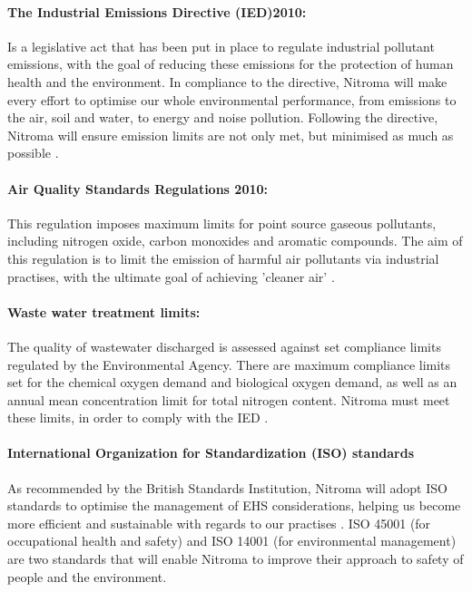 \paragraph{The Industrial Emissions Directive (IED)2010:}

Is a legislative act that has been put in place to regulate industrial pollutant emissions, with the goal of reducing these emissions for the protection of human health and the environment. In compliance to the directive, Nitroma will make every effort to optimise our whole environmental performance, from emissions to the air, soil and water, to energy and noise pollution. Following the directive, Nitroma will ensure emission limits are not only met, but minimised as much as possible \cite{european_commission_industrial_nodate}. 

\paragraph{Air Quality Standards Regulations 2010:}

This regulation imposes maximum limits for point source gaseous pollutants, including nitrogen oxide, carbon monoxides and aromatic compounds. The aim of this regulation is to limit the emission of harmful air pollutants via industrial practises, with the ultimate goal of achieving 'cleaner air' \cite{tilling_meeting_2017}.  

\paragraph{Waste water treatment limits:}

The quality of wastewater discharged is assessed against set compliance limits regulated by the Environmental Agency. There are maximum compliance limits set for the chemical oxygen demand and biological oxygen demand, as well as an annual mean concentration limit for total nitrogen content. Nitroma must meet these limits, in order to comply with the IED \cite{environment_agency_waste_nodate}. 

\paragraph{International Organization for
Standardization (ISO) standards}

As recommended by the British Standards Institution, Nitroma will adopt ISO standards to optimise the management of EHS considerations, helping us become more efficient and sustainable with regards to our practises \cite{british_standards_institution_benefits_nodate}. ISO 45001 (for occupational health and safety) and ISO 14001 (for environmental management) are two standards that will enable Nitroma to improve their approach to safety of people and the environment. 
